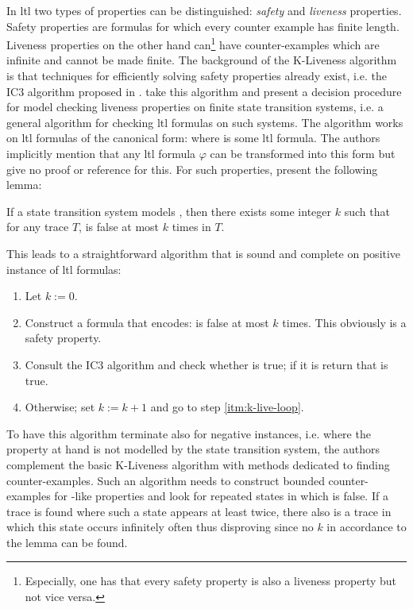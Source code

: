 In \gls{ltl} two types of properties can be distinguished: \textit{safety} and \textit{liveness} properties.
Safety properties are formulas for which every counter example has finite length.
Liveness properties on the other hand can\footnote{%
    Especially, one has that every safety property is also a liveness property but not vice versa.
} have counter-examples which are infinite and cannot be made finite.
The background of the K-Liveness algorithm is that techniques for efficiently solving safety properties already exist, i.e. the IC3 algorithm proposed in \cite{Bradley11}.
\citeauthor{Claessen12} take this algorithm and present a decision procedure for model checking liveness properties on finite state transition systems, i.e. a general algorithm for checking \gls{ltl} formulas on such systems.
The algorithm works on \gls{ltl} formulas of the canonical form:  where  is some \gls{ltl} formula.
The authors implicitly mention that any \gls{ltl} formula $ \varphi $ can be transformed into this form but give no proof or reference for this.
For such properties, \citeauthor{Claessen12} present the following lemma:
\begin{lemma}
    If a state transition system models , then there exists some integer $ k $ such that for any trace $ T $,  is false at most $ k $ times in $ T $.
\end{lemma}
This leads to a straightforward algorithm that is sound and complete on positive instance of \gls{ltl} formulas:
\begin{enumerate}
    \item Let $ k := 0 $.
    \item Construct a formula  that encodes:  is false at most $ k $ times. \label{itm:k-live-loop}
    This obviously is a safety property.
    \item Consult the IC3 algorithm and check whether  is true; if it is return that  is true.
    \item Otherwise; set $ k := k + 1 $ and go to step \ref{itm:k-live-loop}.
\end{enumerate}

To have this algorithm terminate also for negative instances, i.e. where the property at hand is not modelled by the state transition system, the authors complement the basic K-Liveness algorithm with methods dedicated to finding counter-examples.
Such an algorithm needs to construct bounded counter-examples for -like properties and look for repeated states in which  is false.
If a trace is found where such a state appears at least twice, there also is a trace in which this state occurs infinitely often thus disproving  since no $ k $ in accordance to the lemma can be found.


